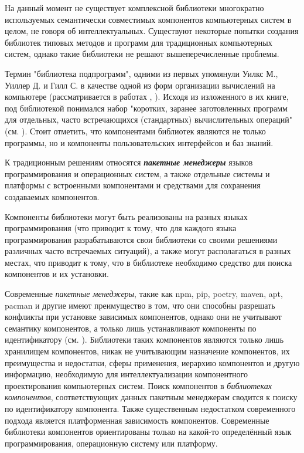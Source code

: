 На данный момент не существует комплексной библиотеки многократно используемых семантически совместимых компонентов компьютерных систем в целом, не говоря об интеллектуальных. Существуют некоторые попытки создания библиотек типовых методов и программ для традиционных компьютерных систем, однако такие библиотеки не решают вышеперечисленные проблемы.

Термин "библиотека подпрограмм"{}, одними из первых упомянули Уилкс М., Уиллер Д. и Гилл С. в качестве одной из форм организации вычислений на компьютере (рассматривается в работах , ). Исходя из изложенного в их книге, под библиотекой понимался набор "коротких, заранее заготовленных программ для отдельных, часто встречающихся (стандартных) вычислительных операций"{} (см. ). Стоит отметить, что компонентами библиотек являются не только программы, но и компоненты пользовательских интерфейсов и баз знаний.

К традиционным решениям относятся \textbf{\textit{пакетные менеджеры}} языков программирования и операционных систем, а также отдельные системы и платформы с встроенными компонентами и средствами для сохранения создаваемых компонентов.

Компоненты библиотеки могут быть реализованы на разных языках программирования (что приводит к тому, что для каждого языка программирования разрабатываются свои библиотеки со своими решениями различных часто встречаемых ситуаций), а также могут располагаться в разных местах, что приводит к тому, что в библиотеке необходимо средство для поиска компонентов и их установки.

Современные \textit{пакетные менеджеры}, такие как npm, pip, poetry, maven, apt, pacman и другие имеют преимущество в том, что они способны разрешать конфликты при установке зависимых компонентов, однако они не учитывают семантику компонентов, а только лишь устанавливают компоненты по идентификатору (см. ). Библиотеки таких компонентов являются только лишь хранилищем компонентов, никак не учитывающим назначение компонентов, их преимущества и недостатки, сферы применения, иерархию компонентов и другую информацию, необходимую для интеллектуализации компонентного проектирования компьютерных систем. Поиск компонентов в \textit{библиотеках компонентов}, соответствующих данных пакетным менеджерам сводится к поиску по идентификатору компонента. Также существенным недостатком современного подхода является платформенная зависимость компонентов. Современные библиотеки компонентов ориентированы только на какой-то определённый язык программирования, операционную систему или платформу.

